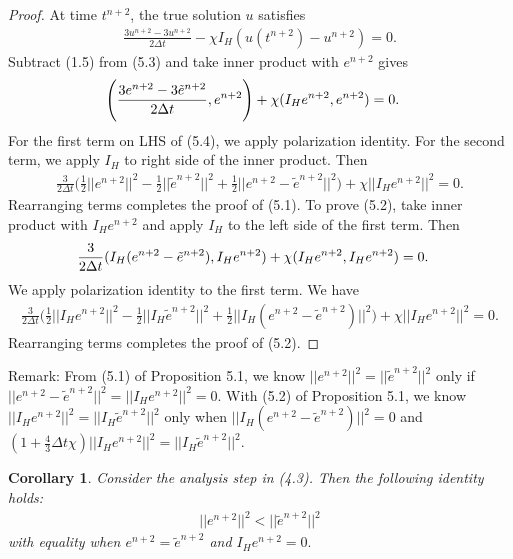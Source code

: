 \documentclass[11pt,a4paper]{article}
\newtheorem{corollary}{Corollary}[theorem]
\begin{document}
\begin{proof}
    At time $t^{n+2}$, the true solution $u$ satisfies
    \begin{align}
        \frac{3u^{n+2}-3u^{n+2}}{2\Delta t} -\chi I_H(u(t^{n+2})-u^{n+2})=0.
    \end{align}
    Subtract (1.5) from (5.3) and take inner product with $e^{n+2}$ gives
    \begin{align}
        \Bigg(\frac{3e^{n+2}-3\Tilde{e}^{n+2}}{2\Delta t}, e^{n+2}\Bigg)
        &+\chi (I_He^{n+2}, e^{n+2})=0.
    \end{align}
    For the first term on LHS of (5.4), we apply polarization identity. For the second term, we apply $I_H$ to right side of the inner product. Then
    \begin{align}
        \frac{3}{2\Delta t}\Bigg(\frac{1}{2}||e^{n+2}||^2-\frac{1}{2}||\tilde{e}^{n+2}||^2+\frac{1}{2}||e^{n+2}-\tilde{e}^{n+2}||^2\Bigg)+\chi||I_H e^{n+2}||^2=0.
    \end{align}
    Rearranging terms completes the proof of (5.1). To prove (5.2), take inner product with $I_He^{n+2}$ and apply $I_H$ to the left side of the first term. Then
    \begin{align}
        \frac{3}{2\Delta t}(I_H(e^{n+2}-\Tilde{e}^{n+2}), I_He^{n+2})
        &+\chi (I_He^{n+2}, I_He^{n+2})=0.
    \end{align}
    We apply polarization identity to the first term. We have
    \begin{align}
        \frac{3}{2\Delta t}\Bigg(\frac{1}{2}||I_He^{n+2}||^2-\frac{1}{2}||I_H\tilde{e}^{n+2}||^2+\frac{1}{2}||I_H(e^{n+2}-\tilde{e}^{n+2})||^2\Bigg)+\chi||I_H e^{n+2}||^2=0.
    \end{align}
    Rearranging terms completes the proof of (5.2).
\end{proof}

Remark: From (5.1) of Proposition 5.1, we know $||e^{n+2}||^2=||\tilde{e}^{n+2}||^2$ only if $||e^{n+2}-\tilde{e}^{n+2}||^2=||I_He^{n+2}||^2=0$. With (5.2) of Proposition 5.1, we know $||I_He^{n+2}||^2=||I_H\tilde{e}^{n+2}||^2$ only when $||I_H(e^{n+2}-\tilde{e}^{n+2})||^2=0$ and $(1+\frac{4}{3}\Delta t \chi)||I_He^{n+2}||^2=||I_H\tilde{e}^{n+2}||^2$.

\begin{corollary}
    Consider the analysis step in (4.3). Then the following identity holds:
    \begin{align}
        ||e^{n+2}||^2< ||\tilde{e}^{n+2}||^2
    \end{align} with equality when $e^{n+2}=\tilde{e}^{n+2}$ and $I_He^{n+2}=0.$
\end{corollary}
\end{document}
